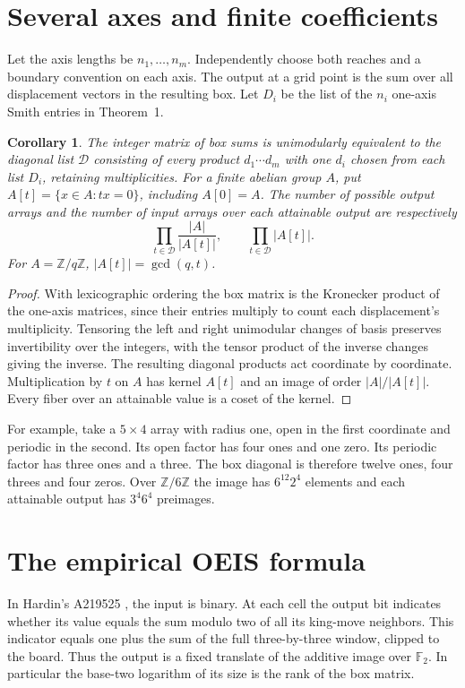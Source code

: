\documentclass[11pt]{article}
\newtheorem{corollary}[theorem]{Corollary}
\newcommand{\Z}{\mathbb Z}
\begin{document}
\section{Several axes and finite coefficients}
Let the axis lengths be $n_1,\ldots,n_m$. Independently choose both reaches and a boundary convention on each axis. The output at a grid point is the sum over all displacement vectors in the resulting box. Let $D_i$ be the list of the $n_i$ one-axis Smith entries in Theorem~1.

\begin{corollary}
The integer matrix of box sums is unimodularly equivalent to the diagonal list $\mathcal D$ consisting of every product $d_1\cdots d_m$ with one $d_i$ chosen from each list $D_i$, retaining multiplicities. For a finite abelian group $A$, put $A[t]=\{x\in A:tx=0\}$, including $A[0]=A$. The number of possible output arrays and the number of input arrays over each attainable output are respectively
\[
       \prod_{t\in\mathcal D}\frac{|A|}{|A[t]|},
       \qquad \prod_{t\in\mathcal D}|A[t]|.
\]
For $A=\Z/q\Z$, $|A[t]|=\gcd(q,t)$.
\end{corollary}
\begin{proof}
With lexicographic ordering the box matrix is the Kronecker product of the one-axis matrices, since their entries multiply to count each displacement's multiplicity. Tensoring the left and right unimodular changes of basis preserves invertibility over the integers, with the tensor product of the inverse changes giving the inverse. The resulting diagonal products act coordinate by coordinate. Multiplication by $t$ on $A$ has kernel $A[t]$ and an image of order $|A|/|A[t]|$. Every fiber over an attainable value is a coset of the kernel.
\end{proof}

For example, take a $5\times4$ array with radius one, open in the first coordinate and periodic in the second. Its open factor has four ones and one zero. Its periodic factor has three ones and a three. The box diagonal is therefore twelve ones, four threes and four zeros. Over $\Z/6\Z$ the image has $6^{12}2^4$ elements and each attainable output has $3^4 6^4$ preimages.

\section{The empirical OEIS formula}
In Hardin's A219525 \cite{hardin}, the input is binary. At each cell the output bit indicates whether its value equals the sum modulo two of all its king-move neighbors. This indicator equals one plus the sum of the full three-by-three window, clipped to the board. Thus the output is a fixed translate of the additive image over $\mathbb F_2$. In particular the base-two logarithm of its size is the rank of the box matrix.
\end{document}
